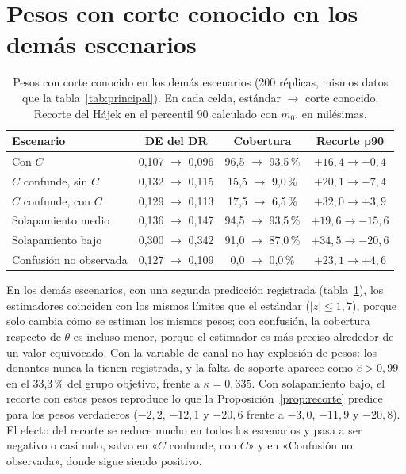 \section{Pesos con corte conocido en los demás escenarios}\label{app:extra}

\begin{table}[ht]
\centering\small
\caption{Pesos con corte conocido en los demás escenarios (200 réplicas, mismos datos que la tabla~\ref{tab:principal}). En cada celda, estándar $\to$ corte conocido. Recorte del Hájek en el percentil 90 calculado con $m_0$, en milésimas.}\label{tab:corte-escenarios}
\begin{tabular}{@{}lccc@{}}
\toprule
Escenario & DE del DR & Cobertura & Recorte p90 \\
\midrule
Con $C$ & 0,107 $\to$ 0,096 & 96,5 $\to$ 93,5\,\% & $+16,4\to-0,4$ \\
$C$ confunde, sin $C$ & 0,132 $\to$ 0,115 & 15,5 $\to$ 9,0\,\% & $+20,1\to-7,4$ \\
$C$ confunde, con $C$ & 0,129 $\to$ 0,113 & 17,5 $\to$ 6,5\,\% & $+32,0\to+3,9$ \\
Solapamiento medio & 0,136 $\to$ 0,147 & 94,5 $\to$ 93,5\,\% & $+19,6\to-15,6$ \\
Solapamiento bajo & 0,300 $\to$ 0,342 & 91,0 $\to$ 87,0\,\% & $+34,5\to-20,6$ \\
Confusión no observada & 0,127 $\to$ 0,109 & 0,0 $\to$ 0,0\,\% & $+23,1\to+4,6$ \\
\bottomrule
\end{tabular}
\end{table}

En los demás escenarios, con una segunda predicción registrada (tabla~\ref{tab:corte-escenarios}), los estimadores coinciden con los mismos límites que el estándar ($|z|\le1,7$), porque solo cambia cómo se estiman los mismos pesos; con confusión, la cobertura respecto de $\theta$ es incluso menor, porque el estimador es más preciso alrededor de un valor equivocado. Con la variable de canal no hay explosión de pesos: los donantes nunca la tienen registrada, y la falta de soporte aparece como $\hat e>0,99$ en el 33,3\,\% del grupo objetivo, frente a $\kappa=0,335$. Con solapamiento bajo, el recorte con estos pesos reproduce lo que la Proposición~\ref{prop:recorte} predice para los pesos verdaderos ($-2,2$, $-12,1$ y $-20,6$ frente a $-3,0$, $-11,9$ y $-20,8$). El efecto del recorte se reduce mucho en todos los escenarios y pasa a ser negativo o casi nulo, salvo en «$C$ confunde, con $C$» y en «Confusión no observada», donde sigue siendo positivo.

